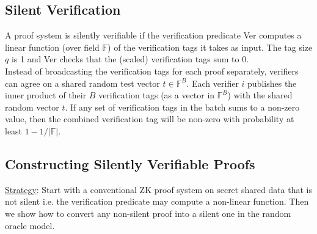 \subsection{Silent Verification}
A proof system is silently verifiable if the verification predicate Ver computes a linear function (over field $\mathbb{F}$) of the verification tags it takes as input. The tag size $q$ is 1 and Ver checks that the (scaled) verification tags sum to 0. \\

Instead of broadcasting the verification tags for each proof separately, verifiers can agree on a shared random test vector $t \in \mathbb{F}^B$. Each verifier $i$ publishes the inner product of their $B$ verification tags (as a vector in $\mathbb{F}^B$) with the shared random vector $t$. If any set of verification tags in the batch sums to a non-zero value, then the combined verification tag will be non-zero with probability at least $1 - 1/|\mathbb{F}|$.

\subsection{Constructing Silently Verifiable Proofs}
\underline{Strategy}: Start with a conventional ZK proof system on secret shared data that is not silent i.e. the verification predicate may compute a non-linear function. Then we show how to convert any non-silent proof into a silent one in the random oracle model.



%
